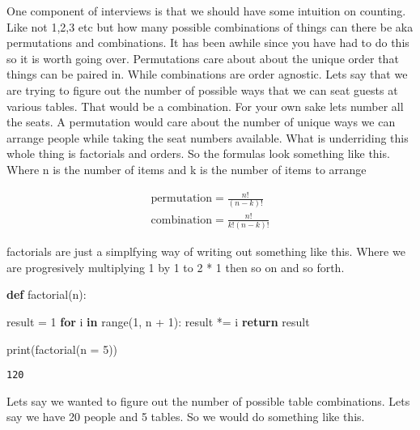\documentclass[
  letterpaper,
  DIV=11,
  numbers=noendperiod]{scrreprt}
\newenvironment{Shaded}{\begin{snugshade}}{\end{snugshade}}
\newcommand{\BuiltInTok}[1]{\textcolor[rgb]{0.00,0.23,0.31}{#1}}
\newcommand{\ControlFlowTok}[1]{\textcolor[rgb]{0.00,0.23,0.31}{\textbf{#1}}}
\newcommand{\DecValTok}[1]{\textcolor[rgb]{0.68,0.00,0.00}{#1}}
\newcommand{\KeywordTok}[1]{\textcolor[rgb]{0.00,0.23,0.31}{\textbf{#1}}}
\newcommand{\NormalTok}[1]{\textcolor[rgb]{0.00,0.23,0.31}{#1}}
\newcommand{\OperatorTok}[1]{\textcolor[rgb]{0.37,0.37,0.37}{#1}}
\begin{document}
One component of interviews is that we should have some intuition on
counting. Like not 1,2,3 etc but how many possible combinations of
things can there be aka permutations and combinations. It has been
awhile since you have had to do this so it is worth going over.
Permutations care about about the unique order that things can be paired
in. While combinations are order agnostic. Lets say that we are trying
to figure out the number of possible ways that we can seat guests at
various tables. That would be a combination. For your own sake lets
number all the seats. A permutation would care about the number of
unique ways we can arrange people while taking the seat numbers
available. What is underriding this whole thing is factorials and
orders. So the formulas look something like this. Where n is the number
of items and k is the number of items to arrange

\begin{align}
\text{permutation} = \frac{n!}{(n-k)!} \\

\text{combination} = \frac{n!}{k!(n-k)!}

\end{align}

factorials are just a simplfying way of writing out something like this.
Where we are progresively multiplying 1 by 1 to 2 * 1 then so on and so
forth.

\begin{Shaded}
\begin{Highlighting}[]
\KeywordTok{def}\NormalTok{ factorial(n):}

\NormalTok{    result }\OperatorTok{=} \DecValTok{1}
    \ControlFlowTok{for}\NormalTok{ i }\KeywordTok{in} \BuiltInTok{range}\NormalTok{(}\DecValTok{1}\NormalTok{, n }\OperatorTok{+} \DecValTok{1}\NormalTok{):}
\NormalTok{        result }\OperatorTok{*=}\NormalTok{ i}
    \ControlFlowTok{return}\NormalTok{ result}

\BuiltInTok{print}\NormalTok{(factorial(n }\OperatorTok{=} \DecValTok{5}\NormalTok{))}
\end{Highlighting}
\end{Shaded}

\begin{verbatim}
120
\end{verbatim}

Lets say we wanted to figure out the number of possible table
combinations. Lets say we have 20 people and 5 tables. So we would do
something like this.
\end{document}
